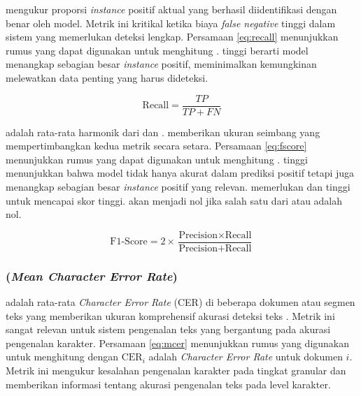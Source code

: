 \recallfl{} mengukur proporsi \emph{instance} positif aktual yang berhasil diidentifikasi dengan benar oleh model. Metrik ini kritikal ketika biaya \emph{false negative} tinggi dalam sistem yang memerlukan deteksi lengkap. Persamaan \eqref{eq:recall} menunjukkan rumus yang dapat digunakan untuk menghitung \recall{} \parencite{jayaswal2020evalmetrics}.\recallfl{} tinggi berarti model menangkap sebagian besar \emph{instance} positif, meminimalkan kemungkinan melewatkan data penting yang harus dideteksi.

\begin{equation}
    \label{eq:recall}
\text{Recall} = \frac{TP}{TP + FN}
\end{equation}

\fscore{} adalah rata-rata harmonik dari \precision{} dan \recall{}. \fscore{} memberikan ukuran seimbang yang mempertimbangkan kedua metrik secara setara. Persamaan \eqref{eq:fscore} menunjukkan rumus yang dapat digunakan untuk menghitung \fscore{} \parencite{jayaswal2020evalmetrics}. \fscore{} tinggi menunjukkan bahwa model tidak hanya akurat dalam prediksi positif tetapi juga menangkap sebagian besar \emph{instance} positif yang relevan. \fscore{} memerlukan \precision{} dan \recall{} tinggi untuk mencapai skor tinggi. \fscore{} akan menjadi nol jika salah satu dari \precision{} atau \recall{} adalah nol.

\begin{equation}
    \label{eq:fscore}
\text{F1-Score} = 2 \times \frac{\text{Precision} \times \text{Recall}}{\text{Precision} + \text{Recall}}
\end{equation}

% 

\subsubsection{\mcer{} (\emph{Mean Character Error Rate})}

\mcer{} adalah rata-rata \emph{Character Error Rate} (CER) di beberapa dokumen atau segmen teks yang memberikan ukuran komprehensif akurasi deteksi teks \parencite{neudecker2021survey}. Metrik ini sangat relevan untuk sistem pengenalan teks yang bergantung pada akurasi pengenalan karakter. Persamaan \eqref{eq:mcer} menunjukkan rumus yang digunakan untuk menghitung \mcer{} dengan $\text{CER}_i$ adalah \emph{Character Error Rate} untuk dokumen $i$. Metrik ini mengukur kesalahan pengenalan karakter pada tingkat granular dan memberikan informasi tentang akurasi pengenalan teks pada level karakter.


